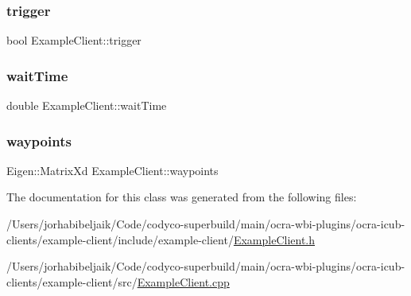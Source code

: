 \subsubsection{\texorpdfstring{trigger}{trigger}}
{\footnotesize\ttfamily bool Example\+Client\+::trigger\hspace{0.3cm}{\ttfamily [private]}}

\hypertarget{classExampleClient_acade7035d4e39290cbda08b98249a629}{}\label{classExampleClient_acade7035d4e39290cbda08b98249a629} 
\subsubsection{\texorpdfstring{wait\+Time}{waitTime}}
{\footnotesize\ttfamily double Example\+Client\+::wait\+Time\hspace{0.3cm}{\ttfamily [private]}}

\hypertarget{classExampleClient_acf4657277ecb08168d9a17c208814823}{}\label{classExampleClient_acf4657277ecb08168d9a17c208814823} 
\subsubsection{\texorpdfstring{waypoints}{waypoints}}
{\footnotesize\ttfamily Eigen\+::\+Matrix\+Xd Example\+Client\+::waypoints\hspace{0.3cm}{\ttfamily [private]}}



The documentation for this class was generated from the following files\+:\begin{DoxyCompactItemize}
\item 
/\+Users/jorhabibeljaik/\+Code/codyco-\/superbuild/main/ocra-\/wbi-\/plugins/ocra-\/icub-\/clients/example-\/client/include/example-\/client/\hyperlink{ExampleClient_8h}{Example\+Client.\+h}\item 
/\+Users/jorhabibeljaik/\+Code/codyco-\/superbuild/main/ocra-\/wbi-\/plugins/ocra-\/icub-\/clients/example-\/client/src/\hyperlink{ExampleClient_8cpp}{Example\+Client.\+cpp}\end{DoxyCompactItemize}

